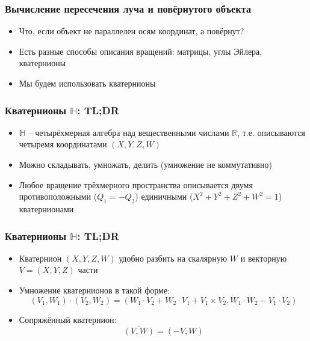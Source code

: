 \documentclass[10pt]{beamer}
\begin{document}
\begin{frame}
\frametitle{Вычисление пересечения луча и повёрнутого объекта}
\begin{itemize}
\item Что, если объект не параллелен осям координат, а повёрнут?
\pause
\item Есть разные способы описания вращений: матрицы, углы Эйлера, кватернионы
\pause
\item Мы будем использовать кватернионы
\end{itemize}
\end{frame}

\begin{frame}
\frametitle{Кватернионы \begin{math}\mathbb{H}\end{math}: TL;DR}
\begin{itemize}
\item \begin{math}\mathbb{H}\end{math} -- четырёхмерная алгебра над вещественными числами \begin{math}\mathbb{R}\end{math}, т.е. описываются четыремя координатами \begin{math}(X,Y,Z,W)\end{math}
\pause
\item Можно складывать, умножать, делить (умножение не коммутативно)
\pause
\item Любое вращение трёхмерного пространства описывается двумя противоположными (\begin{math}Q_1 = -Q_2\end{math}) единичными (\begin{math}X^2+Y^2+Z^2+W^2=1\end{math}) кватернионами
\end{itemize}
\end{frame}

\begin{frame}
\frametitle{Кватернионы \begin{math}\mathbb{H}\end{math}: TL;DR}
\begin{itemize}
\item Кватернион \begin{math}(X,Y,Z,W)\end{math} удобно разбить на скалярную \begin{math}W\end{math} и векторную \begin{math}V = (X, Y, Z)\end{math} части
\pause
\item Умножение кватернионов в такой форме:
\begin{equation}
(V_1,W_1)\cdot(V_2,W_2) = (W_1\cdot V_2 + W_2\cdot V_1 + V_1\times V_2, W_1\cdot W_2 - V_1\cdot V_2)
\end{equation}
\pause
\item Сопряжённый кватернион:
\begin{equation}
\overline{(V,W)} = (-V, W)
\end{equation}
\end{itemize}
\end{frame}
\end{document}
